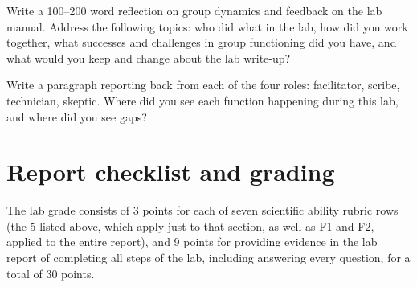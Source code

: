 \begin{steps}
	\item Write a 100--200 word reflection on group dynamics and feedback on the lab manual. Address the following topics: who did what in the lab, how did you work together, what successes and challenges in group functioning did you have, and what would you keep and change about the lab write-up?
	
	\item Write a paragraph reporting back from each of the four roles: facilitator, scribe, technician, skeptic. Where did you see each function happening during this lab, and where did you see gaps?
\end{steps}

\section{Report checklist and grading}

The lab grade consists of 3 points for each of seven scientific ability rubric rows (the 5 listed above, which apply just to that section, as well as F1 and F2, applied to the entire report), and 9 points for providing evidence in the lab report of completing all steps of the lab, including answering every question, for a total of 30 points.